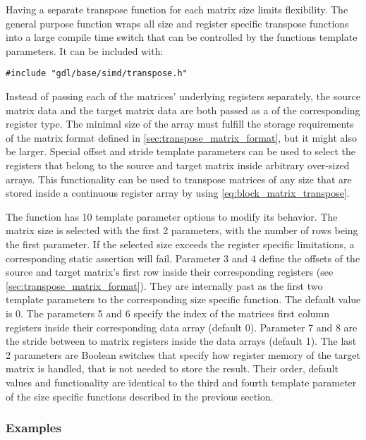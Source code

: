 Having a separate transpose function for each matrix size limits flexibility.
The general purpose function wraps all size and register specific transpose functions into a large compile time switch that can be controlled by the functions template parameters.
It can be included with:

\begin{verbatim}
#include "gdl/base/simd/transpose.h"
\end{verbatim}

Instead of passing each of the matrices' underlying registers separately, the source matrix data and the target matrix data are both passed as a  of the corresponding register type.
The minimal size of the array must fulfill the storage requirements of the matrix format defined in \cref{sec:transpose_matrix_format}, but it might also be larger.
Special offset and stride template parameters can be used to select the registers that belong to the source and target matrix inside arbitrary over-sized arrays.
This functionality can be used to transpose matrices of any size that are stored inside a continuous register array by using \cref{eq:block_matrix_transpose}.

The function has 10 template parameter options to modify its behavior.
The matrix size is selected with the first 2 parameters, with the number of rows being the first parameter.
If the selected size exceeds the register specific limitations, a corresponding static assertion will fail.
Parameter 3 and 4 define the offsets of the source and target matrix's first row inside their corresponding registers (see \cref{sec:transpose_matrix_format}).
They are internally past as the first two template parameters to the corresponding size specific function.
The default value is 0.
The parameters 5 and 6 specify the index of the matrices first column registers inside their corresponding data array (default 0).
Parameter 7 and 8 are the stride between to matrix registers inside the data arrays (default 1).
The last 2 parameters are Boolean switches that specify how register memory of the target matrix is handled, that is not needed to store the result.
Their order, default values and functionality are identical to the third and fourth template parameter of the size specific functions described in the previous section.


\subsubsection*{Examples}


